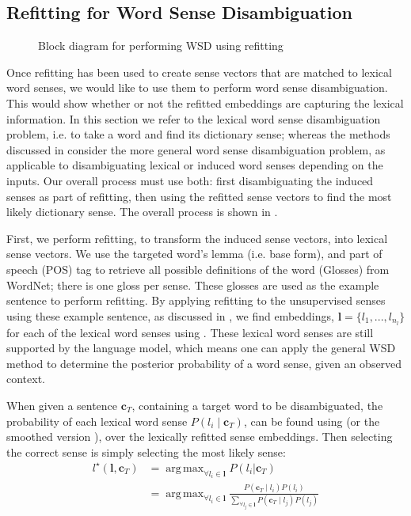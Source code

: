\documentclass{article} %
\renewcommand{\c}{\mathbf{c}}
\renewcommand{\l}{\mathbf{l}}
\DeclareMathOperator*{\argmax}{arg\,max}
\begin{document}
\subsection{Refitting for Word Sense Disambiguation} 
\begin{figure}
	\begin{adjustbox}{max width=\columnwidth}
		
	\end{adjustbox}
	\caption{Block diagram for performing WSD using refitting \label{WSDBlock}} 
\end{figure}
Once refitting has been used to create sense vectors that are matched to lexical word senses, we would like to use them to perform word sense disambiguation. This would show whether or not the refitted embeddings are capturing the lexical information. In this section we refer to the lexical word sense disambiguation problem, i.e. to take a word and find its dictionary sense; whereas the methods discussed in  consider the more general word sense disambiguation problem, as applicable to disambiguating lexical or induced word senses depending on the inputs.
Our overall process must use both: first disambiguating the induced senses as part of refitting, then using the refitted sense vectors to find the most likely dictionary sense.
The overall process is shown in .

First, we perform refitting, to transform the induced sense vectors, into lexical sense vectors.
We use the targeted word's lemma (i.e. base form), and part of speech (POS) tag to retrieve all possible definitions of the word (Glosses) from WordNet; there is one gloss per sense. These glosses are used as the example sentence to perform refitting. By applying refitting to the unsupervised senses using these example sentence, as discussed in , we find embeddings, $\l=\{l_1,..., l_{n_l}\}$ for each of the lexical word senses using . These lexical word senses are still supported by the language model, which means one can apply the general WSD method to determine the posterior probability of a word sense, given an observed context. 

When given a sentence $\c_{T}$, containing a target word to be disambiguated, 
the probability of each lexical word sense $P(l_i \mid \c_{T})$, can be found using  (or the smoothed version ), over the lexically refitted sense embeddings. Then selecting the correct sense is simply selecting the most likely sense:
\begin{equation}
\begin{aligned}\label{eq:lexicalwsd}
l^\star (\l, \c_T) &= \argmax_{\forall l_i \in \l} P(l_i|\c_T) \\
&= \argmax_{\forall l_i \in \l} \frac{P(\c_T \mid l_i)P(l_i)}{\sum_{\forall l_j \in \l} P(\c_T \mid l_j)P(l_j)}
\end{aligned}
\end{equation}
\end{document}
